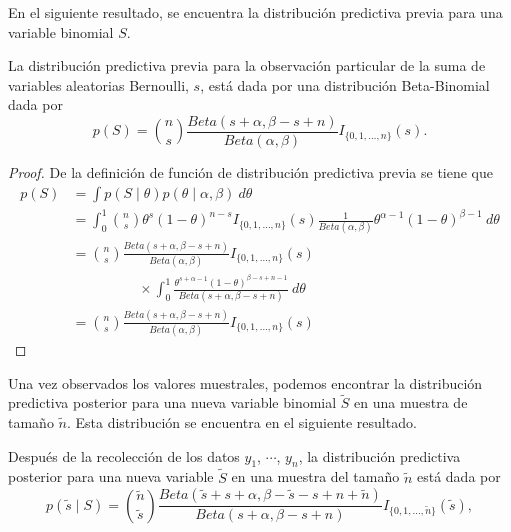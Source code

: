 \documentclass[10pt,openright]{book}\usepackage[]{graphicx}\usepackage[]{color}
\begin{document}
    En el siguiente resultado, se encuentra la distribuci\'on predictiva previa para una variable binomial $S$.
    
    \begin{Res}
    La distribuci\'on predictiva previa para la observaci\'on particular de la suma de variables aleatorias Bernoulli, $s$, est\'a dada por una distribuci\'on Beta-Binomial dada por
    \begin{equation}
    p(S)=\binom{n}{s}\frac{Beta(s+\alpha,\beta-s+n)}{Beta(\alpha,\beta)}I_{\{0,1,\ldots,n\}}(s).
    \end{equation}
    \end{Res}
    
    \begin{proof}
    De la definici\'on de funci\'on de distribuci\'on predictiva previa se tiene que
    \begin{align*}
    p(S)&=\int p(S \mid \theta)p(\theta \mid \alpha,\beta)\ d\theta\\
    &=\int_0^1\binom{n}{s}\theta^s(1-\theta)^{n-s}I_{\{0,1,\ldots,n\}}(s)
    \frac{1}{Beta(\alpha,\beta)}\theta^{\alpha-1}(1-\theta)^{\beta-1}\ d\theta\\
    &=\binom{n}{s}\frac{Beta(s+\alpha,\beta-s+n)}{Beta(\alpha,\beta)}I_{\{0,1,\ldots,n\}}(s)\\
    &\hspace{2cm}\times\int_0^1\frac{\theta^{s+\alpha-1}(1-\theta)^{\beta-s+n-1}}{Beta(s+\alpha,\beta-s+n)}\ d\theta\\
    &=\binom{n}{s}\frac{Beta(s+\alpha,\beta-s+n)}{Beta(\alpha,\beta)}I_{\{0,1,\ldots,n\}}(s)
    \end{align*}
    \end{proof}
    
    
    Una vez observados los valores muestrales, podemos encontrar la distribuci\'on predictiva posterior para una nueva variable binomial $\tilde{S}$ en una muestra de tama\~no $\tilde{n}$. Esta distribuci\'on se encuentra en el siguiente resultado.
    \begin{Res}
    \label{ResPredBinom}
    Despu\'es de la recolecci\'on de los datos $y_1$, $\cdots$, $y_n$, la distribuci\'on predictiva posterior para una nueva variable $\tilde{S}$ en una muestra del tama\~no $\tilde{n}$ est\'a dada por
    \begin{equation}\label{Binom_predict}
    p(\tilde{s} \mid S)=\binom{\tilde{n}}{\tilde{s}}\frac{Beta(\tilde{s}+s+\alpha,\beta-\tilde{s}-s+n+\tilde{n})}{Beta(s+\alpha,\beta-s+n)}I_{\{0,1,\ldots,\tilde{n}\}}(\tilde{s}),
    \end{equation}
    \end{Res}
    
\end{document}

